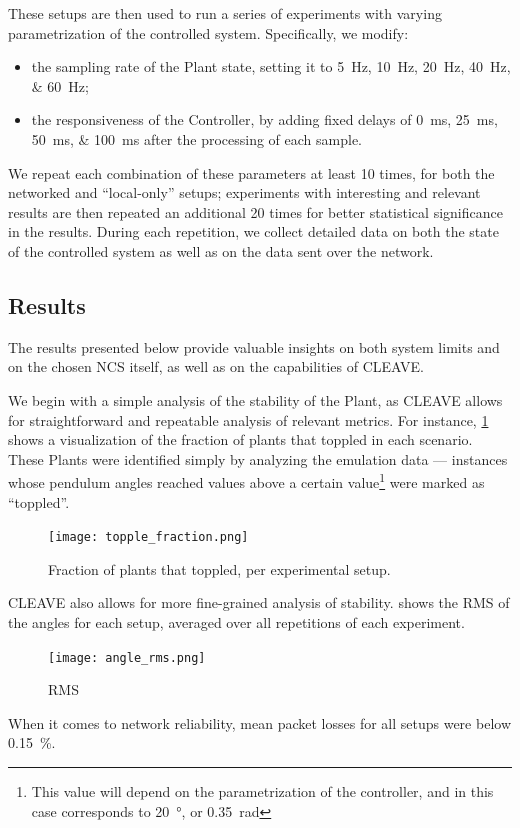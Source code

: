 These setups are then used to run a series of experiments with varying parametrization of the controlled system.
Specifically, we modify:
\begin{itemize}
    \item the sampling rate of the Plant state, setting it to \SIlist[list-units=single,list-final-separator={, or }]{5;10;20;40;60}{\hertz};
    \item the responsiveness of the Controller, by adding fixed delays of  \SIlist[list-units=single,list-final-separator={, or }]{0;25;50;100}{\milli\second} after the processing of each sample.
\end{itemize}
We repeat each combination of these parameters at least \num{10} times, for both the networked and ``local-only'' setups; experiments with interesting and relevant results are then repeated an additional \num{20} times for better statistical significance in the results.
During each repetition, we collect detailed data on both the state of the controlled system as well as on the data sent over the network.

\subsection{Results}\label{ssec:results}

The results presented below provide valuable insights on both system limits and on the chosen \ac{NCS} itself, as well as on the capabilities of \ac{CLEAVE}.

We begin with a simple analysis of the stability of the Plant, as \ac{CLEAVE} allows for straightforward and repeatable analysis of relevant metrics.  
For instance, \cref{fig:topple:fraction} shows a visualization of the fraction of plants that toppled in each scenario.
These Plants were identified simply by analyzing the emulation data --- instances whose pendulum angles reached values above a certain value\footnote{This value will depend on the parametrization of the controller, and in this case corresponds to \SI{20}{\degree}, or \SI{0.35}{\radian}} were marked as ``toppled''.

\begin{figure}
    \centering
    \texttt{[image: topple\_fraction.png]}
    \caption{Fraction of plants that toppled, per experimental setup.}%
    \label{fig:topple:fraction}
\end{figure}

\Ac{CLEAVE} also allows for more fine-grained analysis of stability.
 shows the \ac{RMS} of the angles for each setup, averaged over all repetitions of each experiment.

\begin{figure}
    \centering
    \texttt{[image: angle\_rms.png]}
    \caption{RMS}%
    \label{fig:topple:rms}
\end{figure}

When it comes to network reliability, mean packet losses for all setups were below \SI{0.15}{\percent}. 

